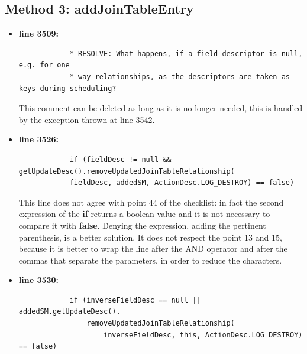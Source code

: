 \documentclass[18pt,oneside,a4paper, titlepage]{article}
\begin{document}
		\subsection{Method 3: addJoinTableEntry}
		\begin{itemize}
			\item \textbf{line 3509:} \begin{lstlisting}
			* RESOLVE: What happens, if a field descriptor is null, e.g. for one
			* way relationships, as the descriptors are taken as keys during scheduling?
			\end{lstlisting}
			\vspace{0.1cm}
			
			This comment can be deleted as long as it is no longer needed, this is handled by the exception thrown at line 3542.
			\item \textbf{line 3526:} \begin{lstlisting}
			if (fieldDesc != null && getUpdateDesc().removeUpdatedJoinTableRelationship(
			fieldDesc, addedSM, ActionDesc.LOG_DESTROY) == false)
			\end{lstlisting}
			\vspace{0.1cm}
			This line does not agree with point 44 of the checklist: in fact the second expression of the \textbf{if} returns a boolean value and it is not necessary to compare it with \textbf{false}. Denying the expression, adding the pertinent parenthesis, is a better solution. It does not respect the point 13 and 15, because it is better to wrap the line after the AND operator and after the commas that separate the parameters, in order to reduce the characters.
			\item \textbf{line 3530:} \begin{lstlisting}
			if (inverseFieldDesc == null || addedSM.getUpdateDesc().
				removeUpdatedJoinTableRelationship(
					inverseFieldDesc, this, ActionDesc.LOG_DESTROY) == false)
			\end{lstlisting}
			\vspace{0.1cm}
			

\end{itemize}
\end{document}
